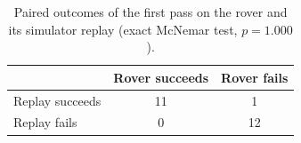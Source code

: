 \begin{table}[htbp]
\centering
\caption{Paired outcomes of the first pass on the rover and its simulator replay (exact McNemar test, $p = 1.000$).}
\label{tab:rdt_mcnemar}
\small
\begin{tabular}{lcc}
\toprule
 & Rover succeeds & Rover fails \\
\midrule
Replay succeeds & 11 & 1 \\
Replay fails & 0 & 12 \\
\bottomrule
\end{tabular}
\end{table}
